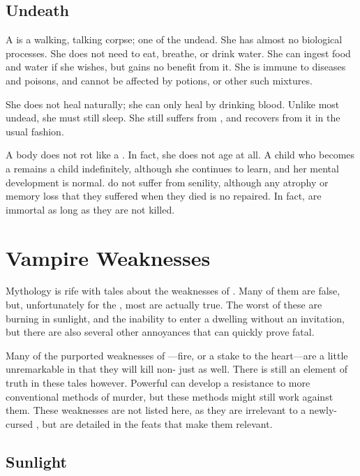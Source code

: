 \subsection{Undeath}

A {\vampire} is a walking, talking corpse; one of the undead.
She has almost no biological processes.
She does not need to eat, breathe, or drink water.
She can ingest food and water if she wishes, but gains no benefit from it.
She is immune to diseases and poisons, and cannot be affected by potions, or other such mixtures.

She does not heal naturally; she can only heal by drinking blood.
Unlike most undead, she must still sleep.
She still suffers from {\exhaustion}, and recovers from it in the usual fashion.

A {\vampirepossessive} body does not rot like a .
In fact, she does not age at all.
A child who becomes a {\vampire} remains a child indefinitely, although she continues to learn, and her mental development is normal.
{\vampires} do not suffer from senility, although any atrophy or memory loss that they suffered when they died is no repaired.
In fact, {\vampires} are immortal as long as they are not killed.

\section{Vampire Weaknesses}

Mythology is rife with tales about the weaknesses of {\vampires}.
Many of them are false, but, unfortunately for the {\vampires}, most are actually true.
The worst of these are burning in sunlight, and the inability to enter a dwelling without an invitation, but there are also several other annoyances that can quickly prove fatal.

Many of the purported weaknesses of {\vampires}---fire, or a stake to the heart---are a little unremarkable in that they will kill non-{\vampires} just as well.
There is still an element of truth in these tales however.
Powerful {\vampires} can develop a resistance to more conventional methods of murder, but these methods might still work against them.
These weaknesses are not listed here, as they are irrelevant to a newly-cursed {\vampire}, but are detailed in the feats that make them relevant.

\subsection{Sunlight}



